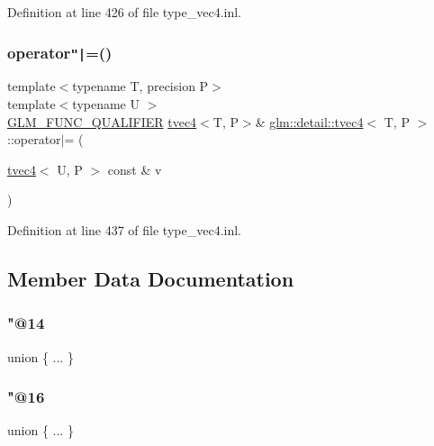 Definition at line 426 of file type\+\_\+vec4.\+inl.

\mbox{\label{structglm_1_1detail_1_1tvec4_a73389ea20bb805a54b9699bca730f142}} 
\subsubsection{\texorpdfstring{operator\texttt{"|}=()}{operator|=()}\hspace{0.1cm}{\footnotesize\ttfamily [4/4]}}
{\footnotesize\ttfamily template$<$typename T, precision P$>$ \\
template$<$typename U $>$ \\
\hyperlink{setup_8hpp_a33fdea6f91c5f834105f7415e2a64407}{G\+L\+M\+\_\+\+F\+U\+N\+C\+\_\+\+Q\+U\+A\+L\+I\+F\+I\+ER} \hyperlink{structglm_1_1detail_1_1tvec4}{tvec4}$<$T, P$>$\& \hyperlink{structglm_1_1detail_1_1tvec4}{glm\+::detail\+::tvec4}$<$ T, P $>$\+::operator$\vert$= (\begin{DoxyParamCaption}\item[{\hyperlink{structglm_1_1detail_1_1tvec4}{tvec4}$<$ U, P $>$ const \&}]{v }\end{DoxyParamCaption})}



Definition at line 437 of file type\+\_\+vec4.\+inl.



\subsection{Member Data Documentation}
\mbox{\label{structglm_1_1detail_1_1tvec4_a6923a5ab35edbc45bcf8bf84da0e1cf1}} 
\subsubsection{\texorpdfstring{"@14}{@14}}
{\footnotesize\ttfamily union \{ ... \} }

\mbox{\label{structglm_1_1detail_1_1tvec4_ac7fe99b840e99cdc5350726979aff886}} 
\subsubsection{\texorpdfstring{"@16}{@16}}
{\footnotesize\ttfamily union \{ ... \} }

